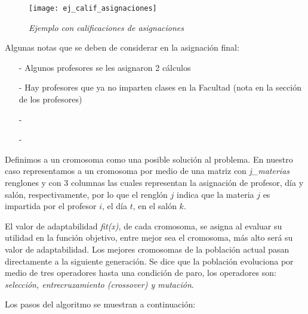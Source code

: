 \begin{figure}[H]
\centering
\texttt{[image: ej\_calif\_asignaciones]} %
\caption{\textit{Ejemplo con calificaciones de asignaciones}}
\end{figure}


Algunas notas que se deben de considerar en la asignación final:

\begin{itemize}
\item[-] Algunos profesores se les asignaron 2 cálculos

\item[-] Hay profesores que ya no imparten clases en la Facultad (nota en la sección de los profesores)

\item[-] 

\item[-] 
\end{itemize}



Definimos a un cromosoma como una posible solución al problema. En nuestro caso representamos a un cromosoma por medio de una matriz con \textit{j\_materias} renglones y con 3 columnas las cuales representan la asignación de profesor, día y salón, respectivamente, por lo que el renglón $j$ indica que la materia $j$ es impartida por el profesor $i$, el día $t$, en el salón $k$.

El valor de adaptabilidad \textit{fit(x)}, de cada cromosoma, se asigna al evaluar su utilidad en la función objetivo, entre mejor sea el cromosoma, más alto será su valor de adaptabilidad. Los mejores cromosomas de la población actual pasan directamente a la siguiente generación. Se dice que la población evoluciona por medio de tres operadores hasta una condición de paro, los operadores son: \textit{selección, entrecruzamiento \textit{(crossover)} y mutación}.

Los pasos del algoritmo se muestran a continuación:


